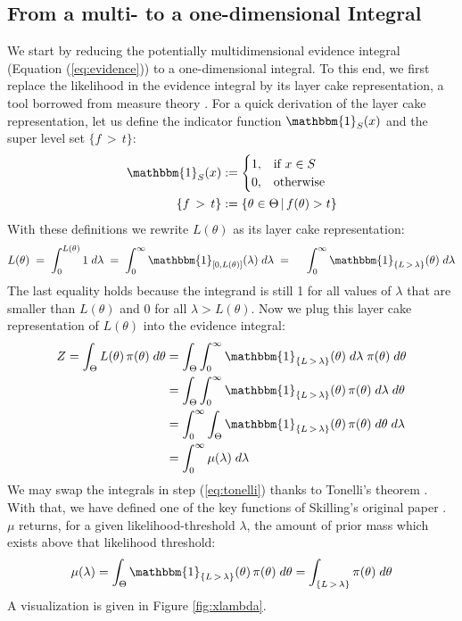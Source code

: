 \documentclass[12pt, a4paper]{report}
\begin{document}
\subsection{From a multi- to a one-dimensional Integral}
We start by reducing the potentially multidimensional evidence integral (Equation (\ref{eq:evidence})) to a one-dimensional integral.
To this end, we first replace the likelihood in the evidence integral by its layer cake representation, a tool borrowed from measure theory \cite[26]{liebloss}.
For a quick derivation of the layer cake representation, let us define the indicator function $\mathbbm{1}_S(x)$  and the super level set $\{f \, > \, t\}$:
\begin{align*}
    \mathbbm{1}_S(x) &:= \begin{cases}
        1, & \textrm{if } x \in S \\
        0, & \textrm{otherwise}
    \end{cases} \\
    \{f \, > \, t\} &:= \{ \theta \in \Theta \, | \, f(\theta) > t \}
\end{align*}
With these definitions we rewrite $L(\theta)$ as its layer cake representation:
\begin{align*}
    L(\theta) 
    \; = \; \int_0^{L(\theta)} 1 \; d\lambda
    \; = \; \int_0^{\infty} \mathbbm{1}_{[0,L(\theta)]}(\lambda) \; d\lambda
    \; = \; \quad \int_0^{\infty} \mathbbm{1}_{\{ L \, > \, \lambda \}}(\theta) \; d\lambda 
\end{align*}
The last equality holds because the integrand is still 1 for all values of $\lambda$ that are smaller than $L(\theta)$ and 0 for all $\lambda > L(\theta)$.
Now we plug this layer cake representation of $L(\theta)$ into the evidence integral:
\begin{align}
    Z = \int_\Theta L(\theta) \, \pi(\theta) \; d\theta &= \int_{\Theta} \int_0^{\infty} \mathbbm{1}_{\{ L \, > \, \lambda \}}(\theta) \; d\lambda \; \pi(\theta) \; d\theta \nonumber\\
    &= \int_\Theta \int_0^{\infty} \mathbbm{1}_{\{ L \, > \, \lambda \}}(\theta) \, \pi(\theta) \; d\lambda \; d\theta \nonumber\\
    &= \int_0^{\infty} \int_\Theta \mathbbm{1}_{\{ L \, > \, \lambda \}}(\theta) \, \pi(\theta) \; d\theta \; d\lambda \label{eq:tonelli}\\
    &= \int_0^{\infty} \mu(\lambda) \; d\lambda
    \label{eq:integral_2}
\end{align}
We may swap the integrals in step (\ref{eq:tonelli}) thanks to Tonelli's theorem \cite[147]{measure_theory}.
With that, we have defined one of the key functions of Skilling's original paper \cite{skilling}.
$\mu$ returns, for a given likelihood-threshold $\lambda$, the amount of prior mass which exists above that likelihood threshold:
\begin{align}
\mu(\lambda) 
= \int_\Theta \mathbbm{1}_{\{ L \, > \, \lambda \}}(\theta) \, \pi(\theta) \; d\theta
= \int_{\{L \,>\, \lambda\}} \pi(\theta) \; d\theta \label{eq:mu_definition}
\end{align}
A visualization is given in Figure \ref{fig:xlambda}.
\end{document}
